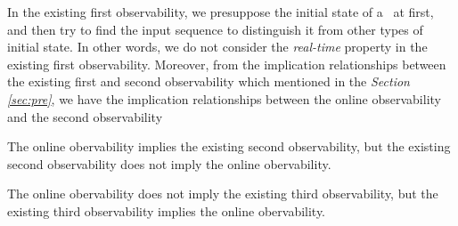 In the existing first observability, we presuppose the initial state of a \BCN\ at first, and then try to find the input sequence to distinguish it from other types of initial state. In other words, we do not consider the {\em real-time} property in the existing first observability. Moreover, from the implication relationships between the existing first and second observability which mentioned in the {\em Section \ref{sec:pre}}, we have the implication relationships between the online observability and the second observability
\begin{theorem}
The online obervability implies the existing second observability, but the existing second observability does not imply the online obervability.
\label{theo:4}
\end{theorem}
\begin{theorem}
The online obervability does not imply the existing third observability, but the existing third observability implies the online obervability.
\end{theorem}
